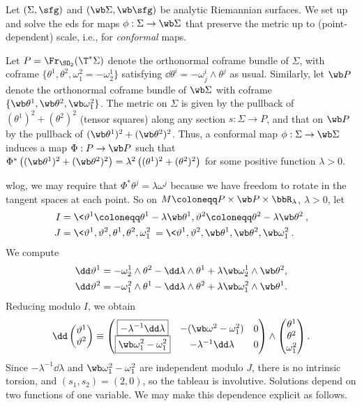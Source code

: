 \begin{example}
    Let $(\Sigma,\sfg)$ and $(\wb\Sigma,\wb \sfg)$ be analytic Riemannian surfaces. We set up and solve the \gls{eds} for maps $\phi:\Sigma\to \wb \Sigma$ that preserve the metric up to (point-dependent) scale, i.e., for \emph{conformal} maps.

    Let $P=\Fr_{\SO_2}(\T^\ast \Sigma)$ denote the orthonormal coframe bundle of $\Sigma$, with coframe $\{\theta^1,\theta^2,\omega^2_1=-\omega^1_2\}$ satisfying $\dd\theta^i=-\omega^i_j\wedge \theta^j$ as usual. Similarly, let $\wb P$ denote the orthonormal coframe bundle of $\wb\Sigma$ with coframe $\{\wb\theta^1,\wb\theta^2,\wb\omega^2_1\}$. The metric on $\Sigma$ is given by the pullback of $(\theta^1)^2+(\theta^2)^2$ (tensor squares) along any section $s:\Sigma\to P$, and that on $\wb P$ by the pullback of $(\wb\theta^1)^2+(\wb\theta^2)^2$. Thus, a conformal map $\phi:\Sigma\to \wb\Sigma$ induces  a map $\Phi:P\to \wb P$ such that $\Phi^\ast \left((\wb\theta^1)^2+(\wb\theta^2)^2\right)=\lambda^2 \left((\theta^1)^2+(\theta^2)^2\right)$ for some positive function $\lambda>0$.

    \gls{wlog}, we may require that $\Phi^\ast\theta^j=\lambda\omega^j$ because we have freedom to rotate in the tangent spaces at each point. So on $M\coloneqq P\times \wb P\times \bbR_\lambda$, $\lambda>0$, let 
    \begin{align}
        I&=\<\vartheta^1\coloneqq \theta^1-\lambda\wb\theta^1,\vartheta^2\coloneqq \theta^2-\lambda\wb\theta^2\>,\\
        J&=\<\vartheta^1,\vartheta^2,\theta^1,\theta^2,\omega^2_1\>=\<\vartheta^1,\vartheta^2,\wb\theta^1,\wb\theta^2,\wb\omega^2_1\>.
    \end{align}
    We compute 
    \begin{align}
        \dd \vartheta^1 &= -\omega^1_2\wedge \theta^2-\dd\lambda\wedge\theta^1+\lambda\wb\omega^1_2\wedge\wb\theta^2,\\
        \dd\vartheta^2&=-\omega^2_1\wedge\theta^1-\dd\lambda\wedge\theta^2+\lambda\wb\omega^2_1\wedge \wb\theta^1.
    \end{align}
    Reducing modulo $I$, we obtain 
    \[\dd\begin{pmatrix}
        \vartheta^1\\
        \vartheta^2
    \end{pmatrix}
    \equiv 
    \begin{pmatrix}
        \boxed{-\lambda^{-1}\dd\lambda} & -(\wb\omega^2-\omega^2_1) & 0\\
        \boxed{\wb\omega^2_1 -\omega^2_1} & -\lambda^{-1}\dd\lambda & 0
    \end{pmatrix}
    \wedge 
    \begin{pmatrix}
        \theta^1\\\theta^2\\\omega^2_1
    \end{pmatrix}.
    \]
    Since $-\lambda^{-1}\dd\lambda$ and $\wb\omega^2_1-\omega^2_1$ are independent modulo $J$, there is no intrinsic torsion, and $(s_1,s_2)=(2,0)$, so the tableau is involutive. Solutions depend on two functions of one variable. We may make this dependence explicit as follows.


\end{example}
